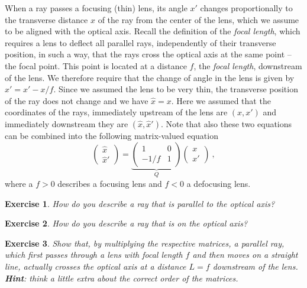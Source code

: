 \documentclass{article}
\newtheorem{exercise}{Exercise}
\begin{document}
When a ray passes a focusing (thin) lens, its angle $x'$ changes proportionally
to the transverse distance $x$ of the ray from the center of the lens, which we assume 
to be aligned with the optical axis. Recall the definition of the {\em focal length}, which 
requires a lens to deflect all parallel rays, independently of their transverse position,
in such a way, that the rays cross the optical axis at the same point -- the focal
point. This point is located at a distance $f$, the {\em focal length}, downstream of the lens.
We therefore require that the change of angle in the lens is given by $\hat x'=x'-x/f.$
Since we assumed the lens to be very thin, the transverse position of the ray does
not change and we have $\hat x=x.$ Here we assumed that the coordinates of the rays,
immediately upstream of the lens are $(x,x')$ and immediately downstream they
are $(\hat x, \hat x').$ Note that also these two equations can be combined into 
the following matrix-valued equation
\begin{equation}\label{eq:quad}
\left(\begin{array}{c} \hat x\\ \hat x'\end{array}\right)
=\underbrace{\left(\begin{array}{cc} 1 &0\\ -1/f & 1\end{array}\right)}_{Q}
\left(\begin{array}{c} x\\x'\end{array}\right)\ ,
\end{equation}
where a $f>0$ describes a focusing lens and $f<0$ a defocusing lens.

\begin{exercise}
How do you describe a ray that is parallel to the optical axis?
\end{exercise}

\begin{exercise}
How do you describe a ray that is on the optical axis?
\end{exercise}

\begin{exercise}
\label{ex4}
Show that, by multiplying the respective matrices,  a parallel ray, which first passes through a lens with focal length $f$ and then moves on a straight line, actually crosses the optical axis at a distance $L=f$ downstream of the lens. 
\textbf{Hint}: think a little extra about the correct order of the matrices.
\end{exercise}
\end{document}
